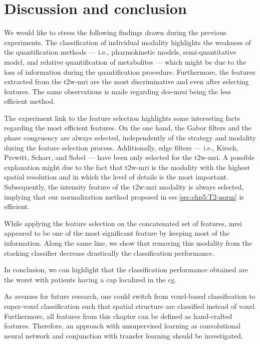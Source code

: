 \section{Discussion and conclusion}\label{sec:chp6:discussion}

We would like to stress the following findings drawn during the previous experiments.
The classification of individual modality highlights the weakness of the quantification methods --- i.e., pharmokinetic models, semi-quantitative model, and relative quantification of metabolites --- which might be due to the loss of information during the quantification procedure.
Furthermore, the features extracted from the \ac{t2w}-\ac{mri} are the most discriminative and even after selecting features.
The same observations is made regarding \ac{dce}-\ac{mrsi} being the less efficient method.

The experiment link to the feature selection highlights some interesting facts regarding the most efficient features.
On the one hand, the Gabor filters and the phase congruency are always selected, independently of the strategy and modality during the feature selection process.
Additionally, edge filters --- i.e., Kirsch, Prewitt, Scharr, and Sobel --- have been only selected for the \ac{t2w}-\ac{mri}.
A possible explanation might due to the fact that \ac{t2w}-\ac{mri} is the modality with the highest spatial resolution and in which the level of details is the most important.
Subsequently, the intensity feature of the \ac{t2w}-\ac{mri} modality is always selected, implying that our normalization method proposed in \acs{sec}\,\ref{sec:chp5:T2-norm} is efficient.

While applying the feature selection on the concatenated set of features, \ac{mrsi} appeared to be one of the most significant feature by keeping most of the information.
Along the same line, we show that removing this modality from the stacking classifier decrease drastically the classification performance.

In conclusion, we can highlight that the classification performance obtained are the worst with patients having a \ac{cap} localized in the \ac{cg}. 

As avenues for future research, one could switch from voxel-based classification to super-voxel classification such that spatial structure are classified instead of voxel.
Furthermore, all features from this chapter can be defined as hand-crafted features.
Therefore, an approach with unsupervised learning as convolutional neural network and conjunction with transfer learning should be investigated.

